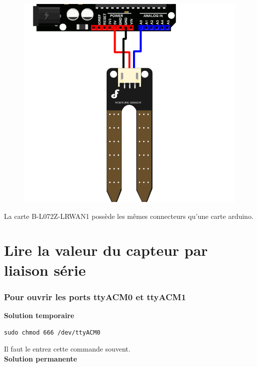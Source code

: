 \documentclass{article}
\begin{document}
\begin{figure}[H]
\begin{center}
\advance\leftskip-3cm
\advance\rightskip-3cm
\includegraphics[keepaspectratio=true,scale=0.4]{connection.png}
\label{visina8}
\end{center}\end{figure}

La carte B-L072Z-LRWAN1 possède les mêmes connecteurs qu'une carte arduino.




\section{Lire la valeur du capteur par liaison série}


\subsubsection{Pour ouvrir les ports ttyACM0 et ttyACM1 }

\textbf{Solution temporaire} 


\begin{verbatim}
sudo chmod 666 /dev/ttyACM0
\end{verbatim}
Il faut le entrez cette commande souvent. \\
\textbf{Solution permanente}\\
\end{document}
